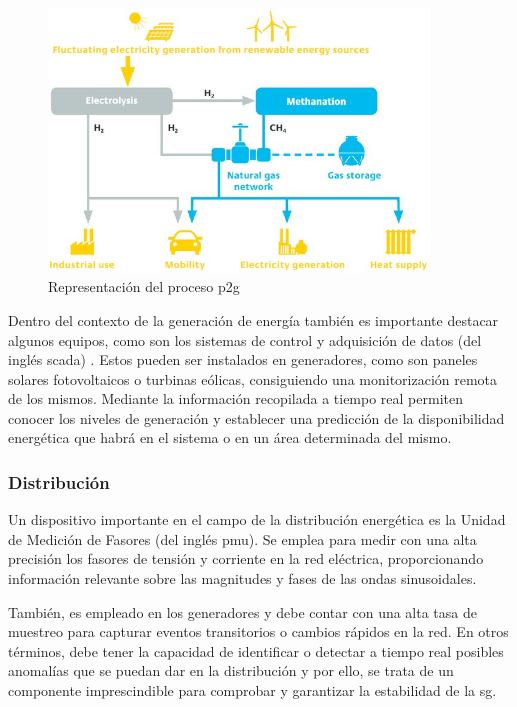 \begin{figure}[h!]
  \centering
  \includegraphics[width=0.9\textwidth]{img/teoria/p2g.jpg}
  \caption{Representación del proceso \acrshort{p2g} \cite{p2g}}
  \label{fig:p2g}
\end{figure}

\vspace{3mm}

Dentro del contexto de la generación de energía también es importante destacar algunos equipos, como son los sistemas de control y adquisición de datos (del inglés \gls{scada}) \cite{scada}. Estos pueden ser instalados en generadores, como son paneles solares fotovoltaicos o turbinas eólicas, consiguiendo una monitorización remota de los mismos. Mediante la información recopilada a tiempo real permiten conocer los niveles de generación y establecer una predicción de la disponibilidad energética que habrá en el sistema o en un área determinada del mismo.

\vspace{3mm}

\subsubsection{Distribución}

Un dispositivo importante en el campo de la distribución energética es la Unidad de Medición de Fasores (del inglés \gls{pmu}). Se emplea para medir con una alta precisión los fasores de tensión y corriente en la red eléctrica, proporcionando información relevante sobre las magnitudes y fases de las ondas sinusoidales. 

\vspace{3mm}

También, es empleado en los generadores y debe contar con una alta tasa de muestreo para capturar eventos transitorios o cambios rápidos en la red. En otros términos, debe tener la capacidad de identificar o detectar a tiempo real posibles anomalías que se puedan dar en la distribución y por ello, se trata de un componente imprescindible para comprobar y garantizar la estabilidad de la \gls{sg}. %

